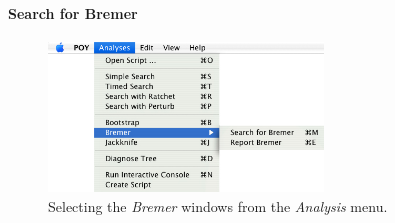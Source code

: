 {\paragraph{Search for Bremer}

\begin{figure}[htpb]
    \begin{center}
        \includegraphics[width=0.65\textwidth]{doc/figures/searchforbremer_menu.jpg}
    \end{center}
    \caption{ Selecting the \emph{Bremer} windows from the \emph{Analysis} menu.}
    \label{fig:search_for_bermer_menu}
\end{figure}

}
